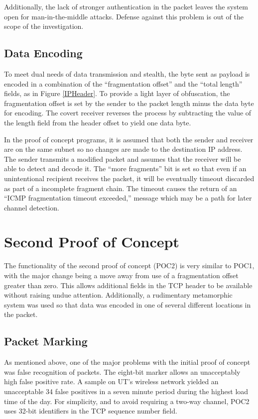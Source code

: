\documentclass[letterpaper,10pt,draft]{article}
\begin{document}
Additionally, the lack of stronger authentication in the packet leaves
the system open for man-in-the-middle attacks.  Defense against
this problem is out of the scope of the investigation.

\subsection{Data Encoding}

To meet dual needs of data transmission and stealth, the byte sent as
payload is encoded in a combination of the ``fragmentation offset'' and
the ``total length'' fields, as in Figure \ref{IPHeader}.  To provide a
light layer of obfuscation, the fragmentation offset is set by the
sender to the packet length minus the data byte for encoding. The
covert receiver reverses the process by subtracting the value of the
length field from the header offset to yield one data byte.

In the proof of concept programs, it is assumed that both the sender
and receiver are on the same subnet so no changes are made to the
destination IP address.  The sender transmits a modified packet and
assumes that the receiver will be able to detect and decode it.  The
``more fragments'' bit is set so that even if an unintentional
recipient receives the packet, it will be eventually timeout discarded
as part of a incomplete fragment chain.  The timeout causes the return
of an ``ICMP fragmentation timeout exceeded,'' message which may be a
path for later channel detection.

\section{Second Proof of Concept}

The functionality of the second proof of concept (POC2) is very
similar to POC1, with the major change being a move away from use of a
fragmentation offset greater than zero.  This allows additional fields
in the TCP header to be available without raising undue attention.
Additionally, a rudimentary metamorphic system was used so that data
was encoded in one of several different locations in the packet.

\subsection{Packet Marking}

As mentioned above, one of the major problems with the initial proof
of concept was false recognition of packets.  The eight-bit marker
allows an unacceptably high false positive rate.  A sample on UT's
wireless network yielded an unacceptable 34 false positives in a seven
minute period during the highest load time of the day.  For
simplicity, and to avoid requiring a two-way channel, POC2 uses 32-bit
identifiers in the TCP sequence number field.
\end{document}
